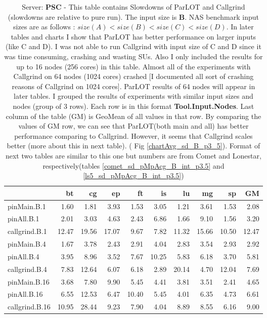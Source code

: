 \begin{table*}[]
 \caption{Server: \textbf{PSC} - This table contains Slowdowns of ParLOT and Callgrind (slowdowns are relative to pure run). The input size is \textbf{B}.  NAS benchmark input sizes are as follows : $size(A) < size(B) < size (C) < size(D) $. In later tables and charts I show that ParLOT has better performance on larger inputs (like C and D). I was not able to run Callgrind with input size of C and D since it was time consuming, crashing and wasting SUs. Also I only included the results for up to 16 nodes (256 cores) in this table. Almost all of the experiments with Callgrind on 64 nodes (1024 cores) crashed [I documented all sort of crashing reasons of Callgrind on 1024 cores]. ParLOT results of 64 nodes will appear in later tables. I grouped the results of experiments with similar input sizes and nodes (group of 3 rows). Each row is in this format \textbf{Tool.Input.Nodes}. Last column of the table (GM) is GeoMean of all values in that row. By comparing the values of GM row, we can see that ParLOT(both main and all) has better performance comparing to Callgrind. However, it seems that Callgrind scales better (more about this in next table). ( Fig \ref{chartAvg_sd_B_p3_5}). Format of next two tables are similar to this one but numbers are from Comet and Lonestar, respectively(tables \ref{comet_sd_pMpAcg_B_int_p3.5} and \ref{ls5_sd_pMpAcg_B_int_p3.5})}
 \label{sd_pMpAcg_B_int_p3.5}
\begin{center}
\begin{tabular}{|l|rrrrrrrr|r|}
\hline
                &    bt &    cg &    ep &    ft &    is &    lu &    mg &    sp &    GM \\
\hline
 pinMain.B.1    &  1.60 &  1.81 &  3.93 &  1.53 &  3.05 &  1.21 &  3.61 &  1.53 &  2.08 \\
 pinAll.B.1     &  2.01 &  3.03 &  4.63 &  2.43 &  6.86 &  1.66 &  9.10 &  1.56 &  3.20 \\
 callgrind.B.1  & 12.47 & 19.56 & 17.07 &  9.67 &  7.82 & 11.32 & 15.66 & 10.50 & 12.47 \\
 \hline
 pinMain.B.4    &  1.67 &  3.78 &  2.43 &  2.91 &  4.04 &  2.83 &  3.54 &  2.93 &  2.92 \\
 pinAll.B.4     &  3.95 &  8.96 &  3.52 &  7.67 & 10.25 &  5.83 &  6.18 &  3.70 &  5.81 \\
 callgrind.B.4  &  7.83 & 12.64 &  6.07 &  6.18 &  2.89 & 20.14 &  4.70 & 12.04 &  7.69 \\
 \hline
 pinMain.B.16   &  3.68 &  7.80 &  9.90 &  5.45 &  4.41 &  3.81 &  3.51 &  2.41 &  4.65 \\
 pinAll.B.16    &  6.55 & 12.53 &  6.47 & 10.40 &  5.45 &  4.01 &  6.35 &  4.73 &  6.61 \\
 callgrind.B.16 & 10.95 & 28.44 &  9.23 &  7.90 &  4.04 &  8.89 &  8.55 &  6.16 &  9.00 \\
\hline
\end{tabular}
\end{center}
\end{table*}

